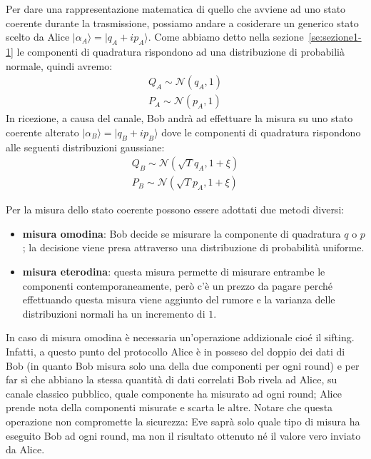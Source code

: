 Per dare una rappresentazione matematica di quello che avviene ad uno stato coerente durante la trasmissione, possiamo andare a cosiderare un generico stato scelto da Alice $|\alpha_A \rangle = | q_A + i p_A\rangle$. Come abbiamo detto nella sezione~\ref{se:sezione1-1} le componenti di quadratura rispondono ad una distribuzione di probabili\`a normale, quindi avremo:
\begin{equation}
\begin{split}
Q_A \sim \mathcal N(q_A, 1) \\
P_A \sim \mathcal N(p_A, 1)
\end{split}
\end{equation}
In ricezione, a causa del canale, Bob andr\`a ad effettuare la misura su uno stato coerente alterato $|\alpha_B \rangle = | q_B + i p_B\rangle$ dove le componenti di quadratura rispondono alle seguenti distribuzioni gaussiane:
\begin{equation}
\begin{split}
Q_B \sim \mathcal N(\sqrt{T} q_A, 1 + \xi) \\
P_B \sim \mathcal N(\sqrt{T} p_A, 1 + \xi)
\end{split}
\end{equation}

Per la misura dello stato coerente possono essere adottati due metodi diversi:
\begin{itemize}
\item \textbf{misura omodina}: Bob decide se misurare la componente di quadratura $q$ o $p$; la decisione viene presa attraverso una distribuzione di probabilit\`a uniforme.
\item \textbf{misura eterodina}: questa misura permette di misurare entrambe le componenti contemporaneamente, per\`o c'\`e un prezzo da pagare perch\'e effettuando questa misura viene aggiunto del rumore e la varianza delle distribuzioni normali ha un incremento di $1$.
\end{itemize}  

In caso di misura omodina \`e necessaria un'operazione addizionale cio\'e il sifting. Infatti, a questo punto del protocollo Alice \`e in posseso del doppio dei dati di Bob (in quanto Bob misura solo una della due componenti per ogni round) e per far s\`i che abbiano la stessa quantit\`a di dati correlati Bob rivela ad Alice, su canale classico pubblico, quale componente ha misurato ad ogni round; Alice prende nota della componenti misurate e scarta le altre\cite{milicevic_key_2018}. Notare che questa operazione non compromette la sicurezza: Eve saprà solo quale tipo di misura ha eseguito Bob ad ogni round, ma non il risultato ottenuto né il valore  vero inviato da Alice.

